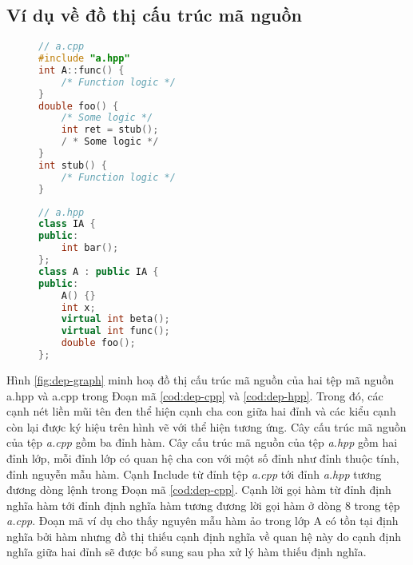 \subsection*{Ví dụ về đồ thị cấu trúc mã nguồn}
\begin{figure}[ht]
    \begin{minipage}[t]{0.49\linewidth}
    \begin{lstlisting}[language=C++, caption={Mã nguồn tệp \textit{a.cpp} minh họa đồ thị cấu trúc mã nguồn.}, label={cod:dep-cpp}, captionpos=b]
// a.cpp
#include "a.hpp"
int A::func() {
    /* Function logic */
}
double foo() {
    /* Some logic */
    int ret = stub();
    / * Some logic */
}
int stub() {
    /* Function logic */
}
    \end{lstlisting}
    \end{minipage}
    \begin{minipage}[t]{0.49\linewidth}
    \begin{lstlisting}[language=C++, caption={Mã nguồn tệp \textit{a.hpp} minh họa đồ thị cấu trúc mã nguồn.}, label={cod:dep-hpp}, captionpos=b]
// a.hpp
class IA {
public: 
    int bar();
};
class A : public IA {
public:
    A() {}
    int x;
    virtual int beta();
    virtual int func();
    double foo();
}; 
    \end{lstlisting}
\end{minipage}
\end{figure}

Hình \ref{fig:dep-graph} minh hoạ đồ thị cấu trúc mã nguồn của hai tệp mã nguồn a.hpp và a.cpp trong Đoạn mã \ref{cod:dep-cpp} và \ref{cod:dep-hpp}. Trong đó, các cạnh nét liền mũi tên đen thể hiện cạnh cha con giữa hai đỉnh và các kiểu cạnh còn lại được ký hiệu trên hình vẽ với thể hiện tương ứng. Cây cấu trúc mã nguồn của tệp \textit{a.cpp} gồm ba đỉnh hàm. Cây cấu trúc mã nguồn của tệp \textit{a.hpp} gồm hai đỉnh lớp, mỗi đỉnh lớp có quan hệ cha con với một số đỉnh như đỉnh thuộc tính, đỉnh nguyễn mẫu hàm. Cạnh Include từ đỉnh tệp \textit{a.cpp} tới đỉnh \textit{a.hpp} tương đương dòng lệnh  trong Đoạn mã \ref{cod:dep-cpp}. Cạnh lời gọi hàm từ đỉnh định nghĩa hàm  tới đỉnh định nghĩa hàm  tương đương lời gọi hàm ở dòng 8 trong tệp \textit{a.cpp}. Đoạn mã ví dụ cho thấy nguyên mẫu hàm ảo  trong lớp A có tồn tại định nghĩa bởi hàm  nhưng đồ thị thiếu cạnh định nghĩa về quan hệ này do cạnh định nghĩa giữa hai đỉnh sẽ được bổ sung sau pha xử lý hàm thiếu định nghĩa.  
 
